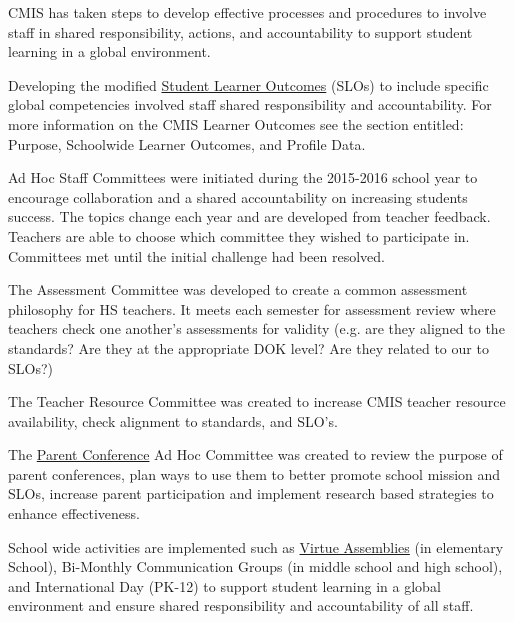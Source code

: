 \begin{findings}
CMIS has taken steps to develop effective processes and procedures to involve staff in shared responsibility, actions, and accountability to support student learning in a global environment.


Developing the modified \href{https://docs.google.com/document/d/1bIbV9pgGz2vpXYJdnRzL_Od5PS35egy7lgBOBuszgD4/edit}{Student Learner Outcomes} (SLOs) to include specific global competencies involved staff shared responsibility and accountability.  For more information on the CMIS Learner Outcomes see the section entitled: Purpose, Schoolwide Learner Outcomes, and Profile Data.


Ad Hoc Staff Committees were initiated during the 2015-2016 school year to encourage collaboration and a shared accountability on increasing students success. The topics change each year and are developed from teacher feedback. Teachers are able to choose which committee they wished to participate in. Committees met until the initial challenge had been resolved. 

The Assessment Committee was developed to create a common assessment philosophy for HS teachers. It meets each semester for assessment review where teachers check one another’s assessments for validity (e.g. are they aligned to the standards? Are they at the appropriate DOK level? Are they related to our to SLOs?) 

The Teacher Resource Committee was created to increase CMIS teacher resource availability, check alignment to standards, and SLO’s. 

The \href{https://docs.google.com/a/cmis.ac.th/presentation/d/1wta0iJ57lCPiV0uJm9plaDBeCSll-VbBkMQUeGwpons/edit?usp=sharing}{Parent Conference} Ad Hoc Committee was created to review the purpose of parent conferences, plan ways to use them to better promote school mission and SLOs, increase parent participation and implement research based strategies to enhance effectiveness.

School wide activities are implemented such as \href{https://docs.google.com/a/cmis.ac.th/document/d/1Mv1xjTpbY36naur8SDt9GanKNfR7YtYVL-bWwGLPSHo/edit?usp=sharing}{Virtue Assemblies} (in elementary School), Bi-Monthly Communication Groups (in middle school and high school), and International Day (PK-12) to support student learning in a global environment and ensure shared responsibility and accountability of all staff.


\end{findings}
